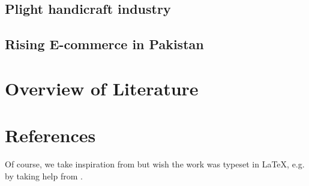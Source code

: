 \subsection{Plight handicraft industry}

\subsection{Rising E-commerce in Pakistan}


\section{Overview of Literature}

\section{References}




















Of course, we take inspiration from \cite{einstein} but wish the work was typeset in \LaTeX \cite{knuthwebsite}, e.g. by taking help from \cite{latexcompanion}.